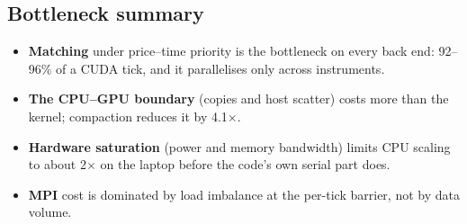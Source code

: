 \subsection{Bottleneck summary}
\begin{itemize}
\item \textbf{Matching} under price--time priority is the bottleneck on every back end: 92--96\% of
  a CUDA tick, and it parallelises only across instruments.
\item \textbf{The CPU--GPU boundary} (copies and host scatter) costs more than the kernel; compaction
  reduces it by 4.1$\times$.
\item \textbf{Hardware saturation} (power and memory bandwidth) limits CPU scaling to about
  2$\times$ on the laptop before the code's own serial part does.
\item \textbf{MPI} cost is dominated by load imbalance at the per-tick barrier, not by data volume.
\end{itemize}
